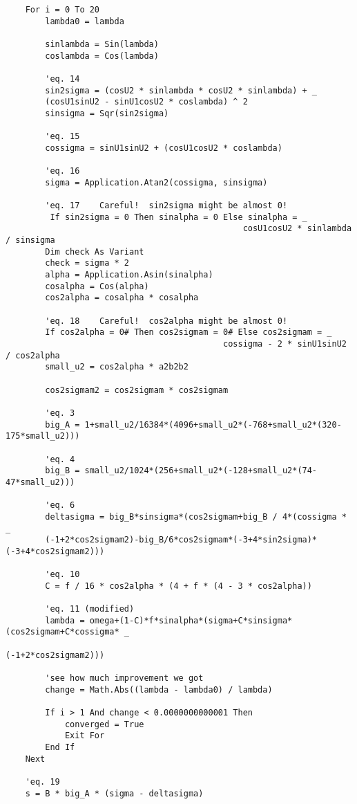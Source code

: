 \begin{lstlisting}
    For i = 0 To 20
        lambda0 = lambda

        sinlambda = Sin(lambda)
        coslambda = Cos(lambda)

        'eq. 14
        sin2sigma = (cosU2 * sinlambda * cosU2 * sinlambda) + _
        (cosU1sinU2 - sinU1cosU2 * coslambda) ^ 2
        sinsigma = Sqr(sin2sigma)

        'eq. 15
        cossigma = sinU1sinU2 + (cosU1cosU2 * coslambda)

        'eq. 16
        sigma = Application.Atan2(cossigma, sinsigma)

        'eq. 17    Careful!  sin2sigma might be almost 0!
         If sin2sigma = 0 Then sinalpha = 0 Else sinalpha = _
                                                cosU1cosU2 * sinlambda / sinsigma
        Dim check As Variant
        check = sigma * 2
        alpha = Application.Asin(sinalpha)
        cosalpha = Cos(alpha)
        cos2alpha = cosalpha * cosalpha

        'eq. 18    Careful!  cos2alpha might be almost 0!
        If cos2alpha = 0# Then cos2sigmam = 0# Else cos2sigmam = _
                                            cossigma - 2 * sinU1sinU2 / cos2alpha
        small_u2 = cos2alpha * a2b2b2

        cos2sigmam2 = cos2sigmam * cos2sigmam

        'eq. 3
        big_A = 1+small_u2/16384*(4096+small_u2*(-768+small_u2*(320-175*small_u2)))

        'eq. 4
        big_B = small_u2/1024*(256+small_u2*(-128+small_u2*(74-47*small_u2)))

        'eq. 6
        deltasigma = big_B*sinsigma*(cos2sigmam+big_B / 4*(cossigma * _
        (-1+2*cos2sigmam2)-big_B/6*cos2sigmam*(-3+4*sin2sigma)*(-3+4*cos2sigmam2)))

        'eq. 10
        C = f / 16 * cos2alpha * (4 + f * (4 - 3 * cos2alpha))

        'eq. 11 (modified)
        lambda = omega+(1-C)*f*sinalpha*(sigma+C*sinsigma*(cos2sigmam+C*cossigma* _
                                                                (-1+2*cos2sigmam2)))

        'see how much improvement we got
        change = Math.Abs((lambda - lambda0) / lambda)

        If i > 1 And change < 0.0000000000001 Then
            converged = True
            Exit For
        End If
    Next
    
    'eq. 19
    s = B * big_A * (sigma - deltasigma)
    

\end{lstlisting}
